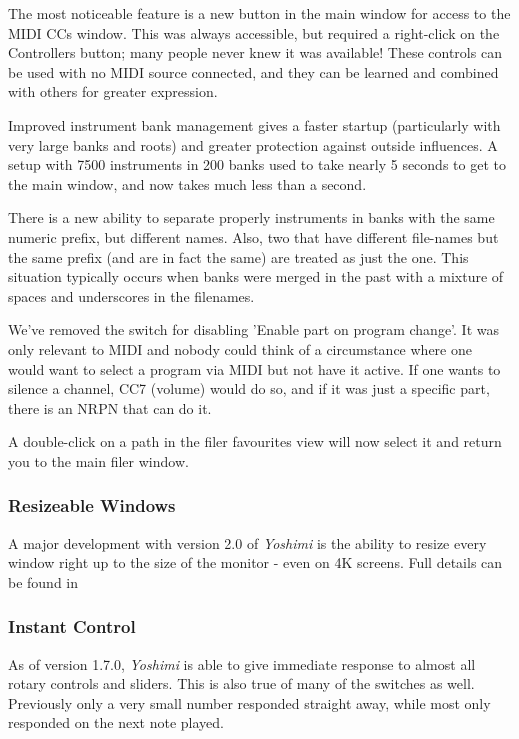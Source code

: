 \documentclass[
 11pt,
 twoside,
 a4paper,
 final                                 %
]{article}
\begin{document}
   The most noticeable feature is a new button in the main window for access to
   the MIDI CCs window. This was always accessible, but required a right-click on
   the Controllers button; many people never knew it was available!
   These controls can be used with no MIDI source connected, and they can be
   learned and combined with others for greater expression.

   Improved instrument bank management gives a faster startup (particularly
   with very large banks and roots) and greater protection against outside
   influences. A setup with 7500 instruments in 200 banks used to take nearly 5
   seconds to get to the main window, and now takes much less than a second.

   There is a new ability to separate properly instruments in banks with the
   same numeric prefix, but different names. Also, two that have different
   file-names but the same prefix (and are in fact the same) are treated as
   just the one. This situation typically occurs when banks were merged in the
   past with a mixture of spaces and underscores in the filenames.

   We've removed the switch for disabling 'Enable part on program change'. It
   was only relevant to MIDI and nobody could think of a circumstance where one
   would want to select a program via MIDI but not have it active. If one wants
   to silence a channel, CC7 (volume) would do so, and if it was just a
   specific part, there is an NRPN that can do it.

   A double-click on a path in the filer favourites view will now select it and
   return you to the main filer window.

\subsubsection{Resizeable Windows}
\label{subsubsec:new_features_resizable_windows}
   A major development with version 2.0 of \textsl{Yoshimi} is the ability to
   resize every window right up to the size of the monitor - even on 4K screens.
   Full details can be found in 

\subsubsection{Instant Control}
\label{subsubsec:new_features_instant_control}
   As of version 1.7.0, \textsl{Yoshimi} is able to give immediate response to
   almost all rotary controls and sliders. This is also true of many of the
   switches as well. Previously only a very small number responded straight away,
   while most only responded on the next note played.
\end{document}
